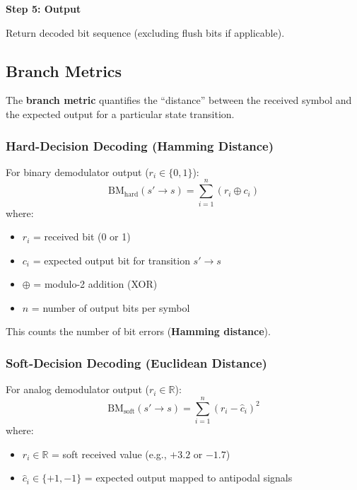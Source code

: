 \textbf{Step 5: Output}

Return decoded bit sequence (excluding flush bits if applicable).

\subsection{Branch Metrics}

The \textbf{branch metric} quantifies the ``distance'' between the received symbol and the expected output for a particular state transition.

\subsubsection{Hard-Decision Decoding (Hamming Distance)}

For binary demodulator output ($r_i \in \{0, 1\}$):
\begin{equation}
\text{BM}_{\text{hard}}(s' \to s) = \sum_{i=1}^{n} (r_i \oplus c_i)
\label{eq:branch-metric-hard}
\end{equation}
where:
\begin{itemize}
\item $r_i$ = received bit (0 or 1)
\item $c_i$ = expected output bit for transition $s' \to s$
\item $\oplus$ = modulo-2 addition (XOR)
\item $n$ = number of output bits per symbol
\end{itemize}

This counts the number of bit errors (\textbf{Hamming distance}).

\subsubsection{Soft-Decision Decoding (Euclidean Distance)}

For analog demodulator output ($r_i \in \mathbb{R}$):
\begin{equation}
\text{BM}_{\text{soft}}(s' \to s) = \sum_{i=1}^{n} (r_i - \hat{c}_i)^2
\label{eq:branch-metric-soft}
\end{equation}
where:
\begin{itemize}
\item $r_i \in \mathbb{R}$ = soft received value (e.g., $+3.2$ or $-1.7$)
\item $\hat{c}_i \in \{+1, -1\}$ = expected output mapped to antipodal signals
\end{itemize}

